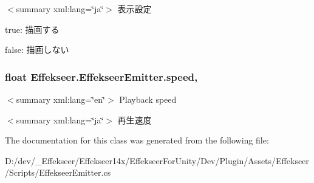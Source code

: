 $<$summary xml\-:lang=\char`\"{}ja\char`\"{}$>$ 表示設定 

true\-: 描画する

false\-: 描画しない\hypertarget{class_effekseer_1_1_effekseer_emitter_a0cbf08f0a3908780bfbe6933cc5baf1e}{
\subsubsection[{speed}]{\setlength{\rightskip}{0pt plus 5cm}float Effekseer.\-Effekseer\-Emitter.\-speed\hspace{0.3cm}{\ttfamily [get]}, {\ttfamily [set]}}}\label{class_effekseer_1_1_effekseer_emitter_a0cbf08f0a3908780bfbe6933cc5baf1e}
$<$summary xml\-:lang=\char`\"{}en\char`\"{}$>$ Playback speed 

$<$summary xml\-:lang=\char`\"{}ja\char`\"{}$>$ 再生速度 

The documentation for this class was generated from the following file\-:\begin{DoxyCompactItemize}
\item 
D\-:/dev/\-\_\-\-Effekseer/\-Effekseer14x/\-Effekseer\-For\-Unity/\-Dev/\-Plugin/\-Assets/\-Effekseer/\-Scripts/Effekseer\-Emitter.\-cs\end{DoxyCompactItemize}
